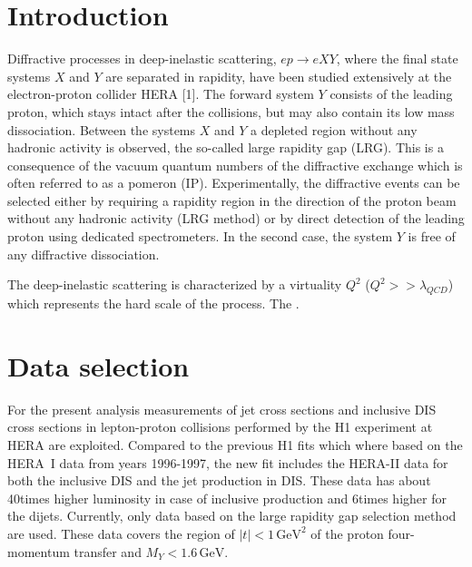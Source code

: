 \documentclass[12pt]{article}
\begin{document}
\clearpage

\pagestyle{plain} %


\section{Introduction}

Diffractive processes in deep-inelastic scattering, $ep \to eXY$, where the final state systems $X$ and $Y$ are separated in rapidity, have been studied extensively at the electron-proton collider HERA [1].
%
The forward system $Y$ consists of the leading proton, which stays intact after the collisions, but may also contain its low mass dissociation.
%
Between the systems $X$ and $Y$ a depleted region without any hadronic activity is observed, the so-called large rapidity gap
(LRG).
%
This is a consequence of the vacuum quantum numbers of the diffractive exchange which is often referred to as a pomeron (IP).
%
Experimentally, the diffractive events can be selected either by requiring a rapidity region in the direction of the proton beam without any hadronic activity (LRG method) or by direct detection of the leading proton using dedicated spectrometers.
%
In the second case, the system $Y$ is free of any diffractive dissociation.

The deep-inelastic scattering is characterized by a virtuality $Q^2$ ($Q^2 >> \lambda_{QCD}$) which represents the hard scale of the process.
The \cite{Collins:1997sr}.




\section{Data selection}
For the present analysis measurements of jet cross sections and inclusive DIS cross sections in lepton-proton collisions performed by the H1 experiment at HERA are exploited.
%
Compared to the previous H1 fits \cite{Aktas:2006hy,Aktas:2007bv} which where based on the HERA~I data from years 1996-1997, the new fit includes the HERA-II data for both the inclusive DIS and the jet production in DIS.
These data has about 40times higher luminosity in case of inclusive production and 6times higher for the dijets.
Currently, only data based on the large rapidity gap selection method are used.
These data covers the region of $|t| < 1\,\text{GeV}^2$ of the proton four-momentum transfer and $M_Y < 1.6\,\text{GeV}$.
\end{document}

